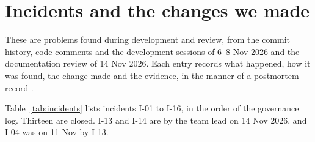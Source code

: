 \chapter{Incidents and the changes we made}
\label{ch:incidents}

These are problems found during development and review, from the commit history, code comments and the development sessions of 6--8 Nov 2026 and the documentation review of 14 Nov 2026. Each entry records what happened, how it was found, the change made and the evidence, in the manner of a postmortem record \parencite{beyer2016sre}.

Table~\ref{tab:incidents} lists incidents I-01 to I-16, in the order of the governance log. Thirteen are closed. I-13 and I-14 are \stAccepted{} by the team lead on 14 Nov 2026, and I-04 was \stReopened{} on 11 Nov by I-13.


